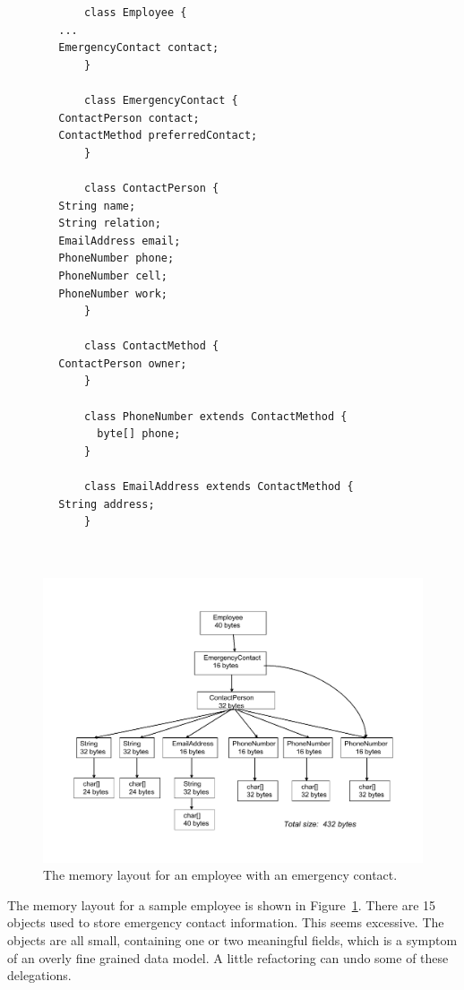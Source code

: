 \ttfamily
\begin{verbatim} 
			class Employee {
        ...
        EmergencyContact contact;
			}
			
			class EmergencyContact {
        ContactPerson contact;
        ContactMethod preferredContact;
			}
			
			class ContactPerson {
        String name;
        String relation;
        EmailAddress email;
        PhoneNumber phone;
        PhoneNumber cell;
        PhoneNumber work;
			}
			
			class ContactMethod {
        ContactPerson owner;
			}
			
			class PhoneNumber extends ContactMethod {
			  byte[] phone;
			}
			
			class EmailAddress extends ContactMethod {
        String address;
			}
			
			
\end{verbatim}
\normalfont
 \begin{figure}
  \centering
 \includegraphics[width=.70\textwidth]{Figures/chapter4/employee-status-fine-grained.pdf}
  \caption{The memory layout for an employee with an emergency contact.}
  \label{fig:employee-status-fine-grained}
\end{figure}
The memory layout for a sample employee is shown in Figure~\ref{fig:employee-status-fine-grained}. There are 15 objects used to store emergency contact information. This seems excessive. The objects are all small, containing one or two meaningful fields, which is a symptom of an overly fine grained data model. A little refactoring can undo some of these delegations.

